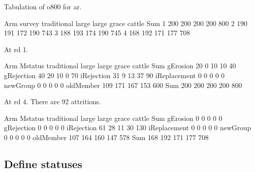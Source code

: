 Tabulation of o800 for \textsf{ar}.
\begin{Schunk}
\begin{Soutput}
      Arm
survey traditional large large grace cattle Sum
     1         200   200         200    200 800
     2         190   191         172    190 743
     3         188   193         174    190 745
     4         168   192         171    177 708
\end{Soutput}
\end{Schunk}
At rd 1.
\begin{Schunk}
\begin{Soutput}
              Arm
Mstatus        traditional large large grace cattle Sum
  gErosion              20     0          10     10  40
  gRejection            40    20          10      0  70
  iRejection            31     9          13     37  90
  iReplacement           0     0           0      0   0
  newGroup               0     0           0      0   0
  oldMember            109   171         167    153 600
  Sum                  200   200         200    200 800
\end{Soutput}
\end{Schunk}
At rd 4. There are 92 attritions.
\begin{Schunk}
\begin{Soutput}
              Arm
Mstatus        traditional large large grace cattle Sum
  gErosion               0     0           0      0   0
  gRejection             0     0           0      0   0
  iRejection            61    28          11     30 130
  iReplacement           0     0           0      0   0
  newGroup               0     0           0      0   0
  oldMember            107   164         160    147 578
  Sum                  168   192         171    177 708
\end{Soutput}
\end{Schunk}

\subsection{Define statuses}

